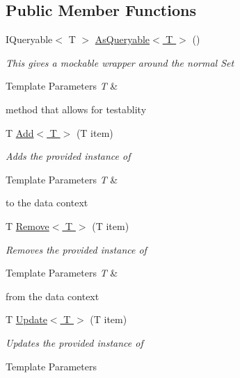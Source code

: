 \subsection*{Public Member Functions}
\begin{DoxyCompactItemize}
\item 
I\-Queryable$<$ T $>$ \hyperlink{interface_framework_extension_1_1_core_1_1_interfaces_1_1_i_data_context_a815dee1d6eb11910fc12250752b654b7}{As\-Queryable$<$ T $>$} ()
\begin{DoxyCompactList}\small\item\em This gives a mockable wrapper around the normal Set
\begin{DoxyTemplParams}{Template Parameters}
{\em T} & \\
\hline
\end{DoxyTemplParams}
method that allows for testablity \end{DoxyCompactList}\item 
T \hyperlink{interface_framework_extension_1_1_core_1_1_interfaces_1_1_i_data_context_a0c8685ab4b1c99f897eba29fba179896}{Add$<$ T $>$} (T item)
\begin{DoxyCompactList}\small\item\em Adds the provided instance of 
\begin{DoxyTemplParams}{Template Parameters}
{\em T} & \\
\hline
\end{DoxyTemplParams}
to the data context \end{DoxyCompactList}\item 
T \hyperlink{interface_framework_extension_1_1_core_1_1_interfaces_1_1_i_data_context_a713205a05d584b6d47325434e6723564}{Remove$<$ T $>$} (T item)
\begin{DoxyCompactList}\small\item\em Removes the provided instance of 
\begin{DoxyTemplParams}{Template Parameters}
{\em T} & \\
\hline
\end{DoxyTemplParams}
from the data context \end{DoxyCompactList}\item 
T \hyperlink{interface_framework_extension_1_1_core_1_1_interfaces_1_1_i_data_context_a1297c0d6e59ec05855d8e25a72f49fdd}{Update$<$ T $>$} (T item)
\begin{DoxyCompactList}\small\item\em Updates the provided instance of 
\begin{DoxyTemplParams}{Template Parameters}

\end{DoxyTemplParams}
\end{DoxyCompactList}
\end{DoxyCompactItemize}
